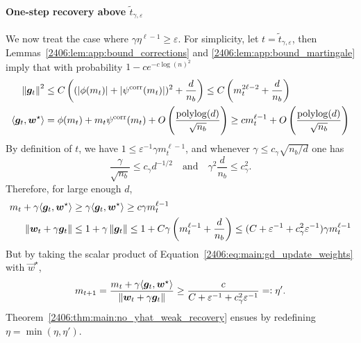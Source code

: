 \paragraph{One-step recovery above $\tilde t_{\gamma, \varepsilon}$} We now treat the case where $\gamma \eta^{\ell-1} \geq \varepsilon$. For simplicity, let $t = \tilde t_{\gamma, \varepsilon}$, then Lemmas~\ref{2406:lem:app:bound_corrections} and \ref{2406:lem:app:bound_martingale} imply that with probability $1 - ce^{-c\log(n)^2}$
\begin{align*}
    \left\lVert {\boldsymbol{g}}_{t}\right\rVert^2 &\leq C\left((|\phi(m_t)| + |\psi^{\mathrm{corr}}(m_t)|)^2 + \frac{d}{n_b}\right) \leq C \left(m_t^{2\ell-2} + \frac{d}{n_b}\right) \\
    \langle {\boldsymbol{g}}_t, {\boldsymbol{w}}^\star \rangle &= \phi(m_t) + m_t\psi^{\mathrm{corr}}(m_t) + O\left( \frac{\operatorname{polylog}(d)}{\sqrt{n_b}} \right) \geq cm_t^{\ell - 1} + O\left( \frac{\operatorname{polylog}(d)}{\sqrt{n_b}} \right)
\end{align*}
By definition of $t$, we have $1 \leq \varepsilon^{-1}\gamma m_t^{\ell-1}$, and whenever $\gamma \leq c_\gamma\sqrt{n_b/d}$ one has
\[ \frac\gamma{\sqrt{n_b}} \leq c_\gamma d^{-1/2} \quad \text{and} \quad \gamma^2 \frac{d}{n_b} \leq c_\gamma^2.\]
Therefore, for large enough $d$,
\begin{align*} 
m_t + \gamma \langle {\boldsymbol{g}}_t, {\boldsymbol{w}}^\star \rangle &\geq  \gamma \langle {\boldsymbol{g}}_t, {\boldsymbol{w}}^\star \rangle \geq c\gamma m_t^{\ell-1}\\
\left\lVert {\boldsymbol{w}}_t + \gamma {\boldsymbol{g}}_t\right\rVert &\leq 1 + \gamma \left\lVert {\boldsymbol{g}}_t\right\rVert \leq 1 + C \gamma \left(m_t^{\ell-1} + \frac{d}{n_b}\right) \leq (C + \varepsilon^{-1} + c_\gamma^2\varepsilon^{-1}) \gamma m_t^{\ell-1} 
\end{align*}
But by taking the scalar product of Equation~\eqref{2406:eq:main:gd_update_weights} with $\vec{w}^\star$,
\[ m_{t+1} = \frac{m_t + \gamma \langle {\boldsymbol{g}}_t, {\boldsymbol{w}}^\star \rangle}{\left\lVert {\boldsymbol{w}}_t + \gamma {\boldsymbol{g}}_t\right\rVert} \geq \frac{c}{C + \varepsilon^{-1} + c_\gamma^2\varepsilon^{-1}} =: \eta'. \]
Theorem~\ref{2406:thm:main:no_yhat_weak_recovery} ensues by redefining $\eta = \min(\eta, \eta').$
